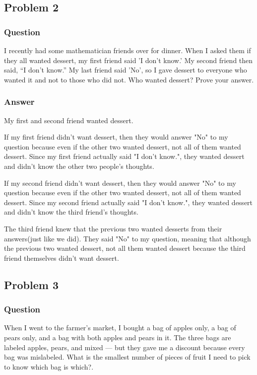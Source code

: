 \documentclass{article}
\begin{document}
\subsection{Problem 2} 
\subsubsection{Question} I recently had some mathematician friends over for dinner. When I asked them if they all wanted dessert, my first friend said 'I don't know.' My second friend then said, “I don’t know.” My last friend said 'No', so I gave dessert to everyone who wanted it and not to those who did not. Who wanted dessert? Prove your answer.

\subsubsection{Answer} My first and second friend wanted dessert. 

If my first friend didn't want dessert, then they would answer "No" to my question because even if the other two wanted dessert, not all of them wanted dessert. Since my first friend actually said "I don't know.", they wanted dessert and didn't know the other two people's thoughts.

If my second friend didn't want dessert, then they would answer "No" to my question because even if the other two wanted dessert, not all of them wanted dessert. Since my second friend actually said "I don't know.", they wanted dessert and didn't know the third friend's thoughts. 

The third friend knew that the previous two wanted desserts from their answers(just like we did). They said "No" to my question, meaning that although the previous two wanted dessert, not all them wanted dessert because the third friend themselves didn't want dessert.

\subsection{Problem 3} 
\subsubsection{Question} When I went to the farmer’s market, I bought a bag of apples only, a bag of pears only, and a bag with both apples and pears in it. The three bags are labeled apples, pears, and mixed — but they gave me a discount because every bag was mislabeled. What is the smallest number of pieces of fruit I need to pick to know which bag is which?.
\end{document}

